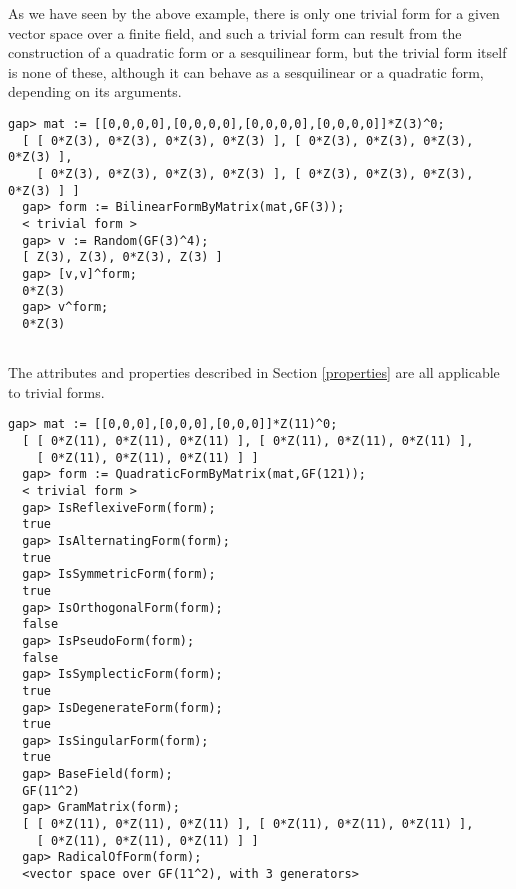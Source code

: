 \documentclass[a4paper,11pt]{report}
\begin{document}
{{\begin{Verbatim}[fontsize=\small,frame=single,label=Example]
\end{Verbatim}
 As we have seen by the above example, there is only one trivial form for a
given vector space over a finite field, and such a trivial form can result
from the construction of a quadratic form or a sesquilinear form, but the
trivial form itself is none of these, although it can behave as a sesquilinear
or a quadratic form, depending on its arguments. 
\begin{Verbatim}[fontsize=\small,frame=single,label=Example]
  gap> mat := [[0,0,0,0],[0,0,0,0],[0,0,0,0],[0,0,0,0]]*Z(3)^0;
  [ [ 0*Z(3), 0*Z(3), 0*Z(3), 0*Z(3) ], [ 0*Z(3), 0*Z(3), 0*Z(3), 0*Z(3) ], 
    [ 0*Z(3), 0*Z(3), 0*Z(3), 0*Z(3) ], [ 0*Z(3), 0*Z(3), 0*Z(3), 0*Z(3) ] ]
  gap> form := BilinearFormByMatrix(mat,GF(3));
  < trivial form >
  gap> v := Random(GF(3)^4);
  [ Z(3), Z(3), 0*Z(3), Z(3) ]
  gap> [v,v]^form;
  0*Z(3)
  gap> v^form;
  0*Z(3)
   
\end{Verbatim}
 The attributes and properties described in Section \ref{properties} are all applicable to trivial forms. 
\begin{Verbatim}[fontsize=\small,frame=single,label=Example]
  gap> mat := [[0,0,0],[0,0,0],[0,0,0]]*Z(11)^0;
  [ [ 0*Z(11), 0*Z(11), 0*Z(11) ], [ 0*Z(11), 0*Z(11), 0*Z(11) ], 
    [ 0*Z(11), 0*Z(11), 0*Z(11) ] ]
  gap> form := QuadraticFormByMatrix(mat,GF(121));
  < trivial form >
  gap> IsReflexiveForm(form);
  true
  gap> IsAlternatingForm(form);
  true
  gap> IsSymmetricForm(form);
  true
  gap> IsOrthogonalForm(form);
  false
  gap> IsPseudoForm(form);
  false
  gap> IsSymplecticForm(form);
  true
  gap> IsDegenerateForm(form);
  true
  gap> IsSingularForm(form);
  true
  gap> BaseField(form);
  GF(11^2)
  gap> GramMatrix(form);
  [ [ 0*Z(11), 0*Z(11), 0*Z(11) ], [ 0*Z(11), 0*Z(11), 0*Z(11) ], 
    [ 0*Z(11), 0*Z(11), 0*Z(11) ] ]
  gap> RadicalOfForm(form);
  <vector space over GF(11^2), with 3 generators>
   
\end{Verbatim}
 }

 }

  
\end{document}
